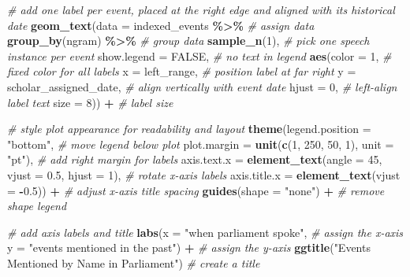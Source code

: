 \documentclass[
]{article}
\newenvironment{Shaded}{\begin{snugshade}}{\end{snugshade}}
\newcommand{\AttributeTok}[1]{\textcolor[rgb]{0.13,0.29,0.53}{#1}}
\newcommand{\CommentTok}[1]{\textcolor[rgb]{0.56,0.35,0.01}{\textit{#1}}}
\newcommand{\ConstantTok}[1]{\textcolor[rgb]{0.56,0.35,0.01}{#1}}
\newcommand{\DecValTok}[1]{\textcolor[rgb]{0.00,0.00,0.81}{#1}}
\newcommand{\FloatTok}[1]{\textcolor[rgb]{0.00,0.00,0.81}{#1}}
\newcommand{\FunctionTok}[1]{\textcolor[rgb]{0.13,0.29,0.53}{\textbf{#1}}}
\newcommand{\NormalTok}[1]{#1}
\newcommand{\SpecialCharTok}[1]{\textcolor[rgb]{0.81,0.36,0.00}{\textbf{#1}}}
\newcommand{\StringTok}[1]{\textcolor[rgb]{0.31,0.60,0.02}{#1}}
\begin{document}
\begin{Shaded}
\begin{Highlighting}[]
  \CommentTok{\# add one label per event, placed at the right edge and aligned with its historical date}
  \FunctionTok{geom\_text}\NormalTok{(}\AttributeTok{data =}\NormalTok{ indexed\_events }\SpecialCharTok{\%\textgreater{}\%} \CommentTok{\# assign data}
            \FunctionTok{group\_by}\NormalTok{(ngram) }\SpecialCharTok{\%\textgreater{}\%} \CommentTok{\# group data}
            \FunctionTok{sample\_n}\NormalTok{(}\DecValTok{1}\NormalTok{), }\CommentTok{\# pick one speech instance per event}
            \AttributeTok{show.legend =} \ConstantTok{FALSE}\NormalTok{, }\CommentTok{\# no text in legend}
            \FunctionTok{aes}\NormalTok{(}\AttributeTok{color =} \DecValTok{1}\NormalTok{, }\CommentTok{\# fixed color for all labels}
                \AttributeTok{x =}\NormalTok{ left\_range, }\CommentTok{\# position label at far right}
                \AttributeTok{y =}\NormalTok{ scholar\_assigned\_date, }\CommentTok{\# align vertically with event date}
                \AttributeTok{hjust =} \DecValTok{0}\NormalTok{, }\CommentTok{\# left{-}align label text}
                \AttributeTok{size =} \DecValTok{8}\NormalTok{)) }\SpecialCharTok{+} \CommentTok{\# label size}

  \CommentTok{\# style plot appearance for readability and layout}
  \FunctionTok{theme}\NormalTok{(}\AttributeTok{legend.position =} \StringTok{"bottom"}\NormalTok{, }\CommentTok{\# move legend below plot}
        \AttributeTok{plot.margin =} \FunctionTok{unit}\NormalTok{(}\FunctionTok{c}\NormalTok{(}\DecValTok{1}\NormalTok{, }\DecValTok{250}\NormalTok{, }\DecValTok{50}\NormalTok{, }\DecValTok{1}\NormalTok{), }\AttributeTok{unit =} \StringTok{"pt"}\NormalTok{), }\CommentTok{\# add right margin for labels}
        \AttributeTok{axis.text.x =} \FunctionTok{element\_text}\NormalTok{(}\AttributeTok{angle =} \DecValTok{45}\NormalTok{, }\AttributeTok{vjust =} \FloatTok{0.5}\NormalTok{, }\AttributeTok{hjust =} \DecValTok{1}\NormalTok{), }\CommentTok{\# rotate x{-}axis labels}
        \AttributeTok{axis.title.x =} \FunctionTok{element\_text}\NormalTok{(}\AttributeTok{vjust =} \SpecialCharTok{{-}}\FloatTok{0.5}\NormalTok{)) }\SpecialCharTok{+} \CommentTok{\# adjust x{-}axis title spacing}
  \FunctionTok{guides}\NormalTok{(}\AttributeTok{shape =} \StringTok{"none"}\NormalTok{) }\SpecialCharTok{+} \CommentTok{\# remove shape legend}

  \CommentTok{\# add axis labels and title}
  \FunctionTok{labs}\NormalTok{(}\AttributeTok{x =} \StringTok{"when parliament spoke"}\NormalTok{, }\CommentTok{\# assign the x{-}axis}
       \AttributeTok{y =} \StringTok{"events mentioned in the past"}\NormalTok{) }\SpecialCharTok{+} \CommentTok{\# assign the y{-}axis}
  \FunctionTok{ggtitle}\NormalTok{(}\StringTok{"Events Mentioned by Name in Parliament"}\NormalTok{) }\CommentTok{\# create a title}
\end{Highlighting}
\end{Shaded}
\end{document}
